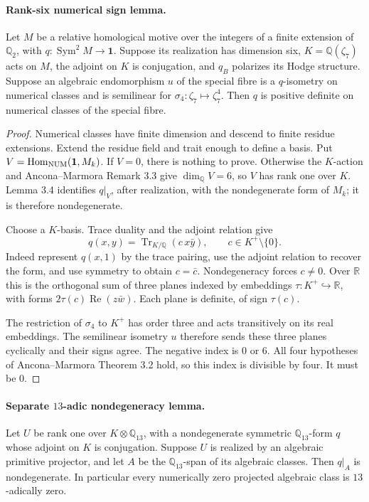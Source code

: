 \documentclass[11pt]{article}
\theoremstyle{remark}\newtheorem{remark}[theorem]{Remark}
\begin{document}
\paragraph{Rank-six numerical sign lemma.}
Let \(M\) be a relative homological motive over the integers of a finite
extension of \(\mathbb Q_2\), with
\(q:\operatorname{Sym}^2M\to\mathbf1\). Suppose its realization has
dimension six, \(K=\mathbb Q(\zeta _7)\) acts on \(M\), the adjoint
on \(K\) is conjugation, and \(q_B\) polarizes its Hodge structure.
Suppose an algebraic endomorphism \(u\) of the special fibre is a
\(q\)-isometry on numerical classes and is semilinear for
\(\sigma_4:\zeta _7\mapsto\zeta _7^4\). Then \(q\) is positive
definite on numerical classes of the special fibre.

\begin{proof}
Numerical classes have finite dimension and descend to finite residue
extensions. Extend the residue field and trait enough to define a
basis. Put \(V=\operatorname{Hom}_{\rm NUM}(\mathbf1,M_k)\).
If \(V=0\), there is nothing to prove. Otherwise the \(K\)-action and
Ancona--Marmora Remark 3.3 give \(\dim_{\mathbb Q}V=6\), so \(V\)
has rank one over \(K\). Lemma 3.4 identifies \(q|_V\), after realization,
with the nondegenerate form of \(M_k\); it is therefore nondegenerate.

Choose a \(K\)-basis. Trace duality and the adjoint relation give
\[
 q(x,y)=\operatorname{Tr}_{K/\mathbb Q}(c\,x\bar y),
 \qquad c\in K^+\setminus\{0\}.
\]
Indeed represent \(q(x,1)\) by the trace pairing, use the adjoint
relation to recover the form, and use symmetry to obtain \(c=\bar c\).
Nondegeneracy forces \(c\ne0\). Over \(\mathbb R\) this is the orthogonal
sum of three planes indexed by embeddings \(\tau:K^+\hookrightarrow
\mathbb R\), with forms \(2\tau(c)\operatorname{Re}(z\bar w)\).
Each plane is definite, of sign \(\tau(c)\).

The restriction of \(\sigma_4\) to \(K^+\) has order three and acts
transitively on its real embeddings. The semilinear isometry \(u\)
therefore sends these three planes cyclically and their signs agree.
The negative index is \(0\) or \(6\). All four hypotheses of
Ancona--Marmora Theorem 3.2 hold, so this index is divisible by four.
It must be \(0\).
\end{proof}

\paragraph{Separate \(13\)-adic nondegeneracy lemma.}
Let \(U\) be rank one over \(K\otimes\mathbb Q_{13}\), with a
nondegenerate symmetric \(\mathbb Q_{13}\)-form \(q\) whose adjoint
on \(K\) is conjugation. Suppose \(U\) is realized by an algebraic
primitive projector, and let \(A\) be the \(\mathbb Q_{13}\)-span
of its algebraic classes. Then \(q|_A\) is nondegenerate. In particular
every numerically zero projected algebraic class is \(13\)-adically zero.
\end{document}
